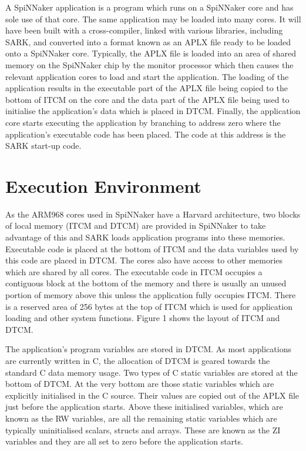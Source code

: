 A SpiNNaker application is a program which runs on a SpiNNaker core
and has sole use of that core. The same application may be loaded into
many cores. It will have been built with a cross-compiler, linked with
various libraries, including SARK, and converted into a format known
as an APLX file ready to be loaded onto a SpiNNaker core. Typically,
the APLX file is loaded into an area of shared memory on the SpiNNaker
chip by the monitor processor which then causes the relevant
application cores to load and start the application. The loading of
the application results in the executable part of the APLX file being
copied to the bottom of ITCM on the core and the data part of the APLX
file being used to initialise the application's data which is placed
in DTCM. Finally, the application core starts executing the
application by branching to address zero where the application's
executable code has been placed. The code at this address is the SARK
start-up code.

\section{Execution Environment}

As the ARM968 cores used in SpiNNaker have a Harvard architecture, two
blocks of local memory (ITCM and DTCM) are provided in SpiNNaker to
take advantage of this and SARK loads application programs into these
memories. Executable code is placed at the bottom of ITCM and the data
variables used by this code are placed in DTCM. The cores also have
access to other memories which are shared by all cores. The executable
code in ITCM occupies a contiguous block at the bottom of the memory
and there is usually an unused portion of memory above this unless the
application fully occupies ITCM. There is a reserved area of 256 bytes
at the top of ITCM which is used for application loading and other
system functions. Figure 1 shows the layout of ITCM and DTCM.


The application's program variables are stored in DTCM. As most
applications are currently written in C, the allocation of DTCM is
geared towards the standard C data memory usage. Two types of C static
variables are stored at the bottom of DTCM. At the very bottom are
those static variables which are explicitly initialised in the C
source. Their values are copied out of the APLX file just before the
application starts. Above these initialised variables, which are known
as the RW variables, are all the remaining static variables which are
typically uninitialised scalars, structs and arrays. These are known
as the ZI variables and they are all set to zero before the
application starts.

